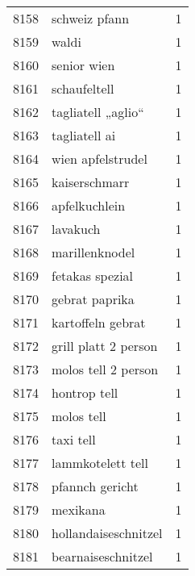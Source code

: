 \begin{tabular}{llr}
8158 &                                      schweiz pfann &      1 \\
8159 &                                              waldi &      1 \\
8160 &                                        senior wien &      1 \\
8161 &                                       schaufeltell &      1 \\
8162 &                                 tagliatell „aglio“ &      1 \\
8163 &                                      tagliatell ai &      1 \\
8164 &                                  wien apfelstrudel &      1 \\
8165 &                                      kaiserschmarr &      1 \\
8166 &                                      apfelkuchlein &      1 \\
8167 &                                           lavakuch &      1 \\
8168 &                                     marillenknodel &      1 \\
8169 &                                    fetakas spezial &      1 \\
8170 &                                     gebrat paprika &      1 \\
8171 &                                  kartoffeln gebrat &      1 \\
8172 &                               grill platt 2 person &      1 \\
8173 &                                molos tell 2 person &      1 \\
8174 &                                       hontrop tell &      1 \\
8175 &                                         molos tell &      1 \\
8176 &                                          taxi tell &      1 \\
8177 &                                  lammkotelett tell &      1 \\
8178 &                                    pfannch gericht &      1 \\
8179 &                                           mexikana &      1 \\
8180 &                               hollandaiseschnitzel &      1 \\
8181 &                                 bearnaiseschnitzel &      1 \\

\end{tabular}
